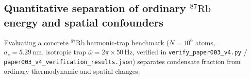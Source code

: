 \documentclass[
  american,
  11pt,
  letterpaper,
]{article}
\begin{document}
\subsection{\texorpdfstring{Quantitative separation of ordinary \(^{87}\mathrm{Rb}\) energy and spatial confounders}{Quantitative separation of ordinary \^{}\{87\}\textbackslash mathrm\{Rb\} energy and spatial confounders}}\label{quantitative-separation-of-ordinary-87mathrmrb-energy-and-spatial-confounders}

Evaluating a concrete \(^{87}\mathrm{Rb}\) harmonic-trap benchmark (\(N = 10^6\) atoms, \(a_s = 5.29\,\mathrm{nm}\), isotropic trap \(\bar{\omega} = 2\pi \times 50\,\mathrm{Hz}\), verified in \nolinkurl{verify_paper003_v4.py} / \nolinkurl{paper003_v4_verification_results.json}) separates condensate fraction from ordinary thermodynamic and spatial changes:
\end{document}
